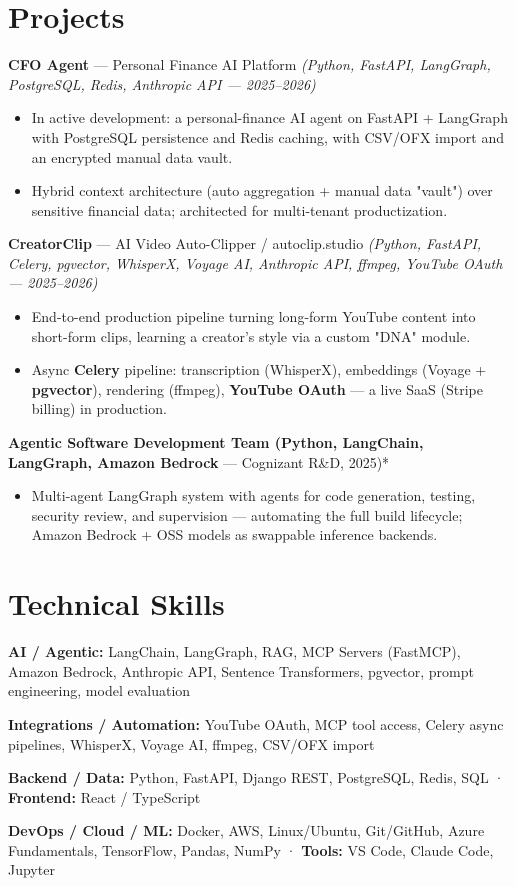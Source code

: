 \documentclass[10pt]{article}
\begin{document}
\section*{Projects}
\noindent\textbf{CFO Agent} --- Personal Finance AI Platform \textit{(Python, FastAPI, LangGraph, PostgreSQL, Redis, Anthropic API — 2025–2026)}\par
\begin{itemize}
  \item In active development: a personal-finance AI agent on FastAPI + LangGraph with PostgreSQL persistence and Redis caching, with CSV/OFX import and an encrypted manual data vault.
  \item Hybrid context architecture (auto aggregation + manual data "vault") over sensitive financial data; architected for multi-tenant productization.
\end{itemize}
\noindent\textbf{CreatorClip} --- AI Video Auto-Clipper / autoclip.studio \textit{(Python, FastAPI, Celery, pgvector, WhisperX, Voyage AI, Anthropic API, ffmpeg, YouTube OAuth — 2025–2026)}\par
\begin{itemize}
  \item End-to-end production pipeline turning long-form YouTube content into short-form clips, learning a creator's style via a custom "DNA" module.
  \item Async \textbf{Celery} pipeline: transcription (WhisperX), embeddings (Voyage + \textbf{pgvector}), rendering (ffmpeg), \textbf{YouTube OAuth} — a live SaaS (Stripe billing) in production.
\end{itemize}
\noindent\textbf{Agentic Software Development Team (Python, LangChain, LangGraph, Amazon Bedrock} --- Cognizant R\&D, 2025)*\par
\begin{itemize}
  \item Multi-agent LangGraph system with agents for code generation, testing, security review, and supervision — automating the full build lifecycle; Amazon Bedrock + OSS models as swappable inference backends.
\end{itemize}
\section*{Technical Skills}
\noindent \textbf{AI / Agentic:} LangChain, LangGraph, RAG, MCP Servers (FastMCP), Amazon Bedrock, Anthropic API, Sentence Transformers, pgvector, prompt engineering, model evaluation\par
\noindent \textbf{Integrations / Automation:} YouTube OAuth, MCP tool access, Celery async pipelines, WhisperX, Voyage AI, ffmpeg, CSV/OFX import\par
\noindent \textbf{Backend / Data:} Python, FastAPI, Django REST, PostgreSQL, Redis, SQL · \textbf{Frontend:} React / TypeScript\par
\noindent \textbf{DevOps / Cloud / ML:} Docker, AWS, Linux/Ubuntu, Git/GitHub, Azure Fundamentals, TensorFlow, Pandas, NumPy · \textbf{Tools:} VS Code, Claude Code, Jupyter\par
\end{document}
